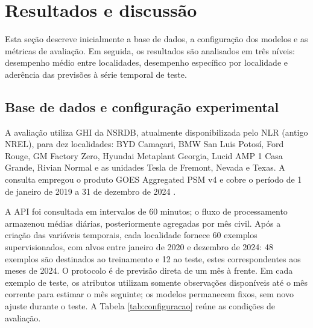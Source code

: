 \documentclass[11pt,a4paper]{article}
\begin{document}
\section{Resultados e discussão}
\label{sec:resultados}

Esta seção descreve inicialmente a base de dados, a configuração dos modelos e as métricas de avaliação. Em seguida, os resultados são analisados em três níveis: desempenho médio entre localidades, desempenho específico por localidade e aderência das previsões à série temporal de teste.

\subsection{Base de dados e configuração experimental}

A avaliação utiliza GHI da NSRDB, atualmente disponibilizada pelo NLR (antigo NREL), para dez localidades: BYD Camaçari, BMW San Luis Potosí, Ford Rouge, GM Factory Zero, Hyundai Metaplant Georgia, Lucid AMP 1 Casa Grande, Rivian Normal e as unidades Tesla de Fremont, Nevada e Texas. A consulta empregou o produto GOES Aggregated PSM v4 e cobre o período de 1 de janeiro de 2019 a 31 de dezembro de 2024 \cite{nlr2026}.

A API foi consultada em intervalos de 60 minutos; o fluxo de processamento armazenou médias diárias, posteriormente agregadas por mês civil. Após a criação das variáveis temporais, cada localidade fornece 60 exemplos supervisionados, com alvos entre janeiro de 2020 e dezembro de 2024: 48 exemplos são destinados ao treinamento e 12 ao teste, estes correspondentes aos meses de 2024. O protocolo é de previsão direta de um mês à frente. Em cada exemplo de teste, os atributos utilizam somente observações disponíveis até o mês corrente para estimar o mês seguinte; os modelos permanecem fixos, sem novo ajuste durante o teste. A Tabela \ref{tab:configuracao} reúne as condições de avaliação.
\end{document}
